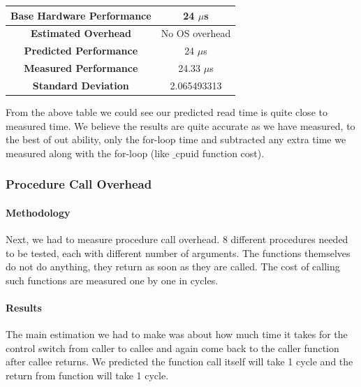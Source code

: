 \documentclass[conference]{IEEEtran}
\begin{document}
\begin{center}
\begin{tabular}{ |c|c| } 
  \hline
  \textbf{Base Hardware Performance} & 24 $\mu$s \\ 
  \hline
  \textbf{Estimated Overhead} &  No OS overhead \\ 
  \hline
  \textbf{Predicted Performance} & 24 $\mu$s \\ 
  \hline
  \textbf{Measured Performance} & 24.33 $\mu$s \\ 
  \hline
  \textbf{Standard Deviation} & 2.065493313  \\ 
  \hline
\end{tabular}
\end{center}

From the above table we could see our predicted read time is quite close to measured time. 
We believe the results are quite accurate as we have measured, to the best of out ability, only the for-loop time and subtracted any extra time we measured along with the for-loop (like $\_$cpuid function cost).



\subsubsection{Procedure Call Overhead}

\paragraph{Methodology}

Next, we had to measure procedure call overhead. 8 different procedures needed to be tested, each with different number of arguments. The functions themselves do not do anything, they return as soon as they are called. The cost of calling such functions are measured one by one in cycles.  

\paragraph{Results}

The main estimation we had to make was about how much time it takes for the control switch from caller to callee and again come back to the caller function after callee returns. We predicted the function call itself will take 1 cycle and the return from function will take 1 cycle. 
\end{document}
